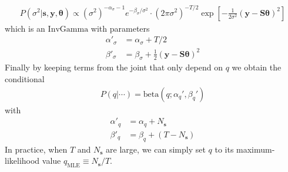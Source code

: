 \documentclass{article}
\theoremstyle{remark}
\begin{document}
\begin{align}
    P(\sigma^2| \bm{s},\bm{y},\bm\theta) \propto (\sigma^2)^{-\alpha_\sigma-1}e^{-\beta_\sigma/\sigma^2}\cdot (2\pi\sigma^2)^{-T/2}\exp\left[-\frac{1}{2\sigma^2}(\bm y-\bm{S\theta})^2\right] 
\end{align}
which is an $\mathrm{InvGamma}$ with parameters
\begin{align}
    \alpha'_{\sigma} &= \alpha_\sigma+T/2\\
    \beta'_\sigma &= \beta_\sigma+\frac{1}{2}(\bm y - \bm{S\theta})^2
\end{align}
Finally by keeping terms from the joint that only depend on $q$ we obtain the conditional
\begin{align}
    P(q|\cdots) = \mathrm{beta}(q;\alpha_q',\beta_q')
\end{align}
with 
\begin{align}
    \alpha'_q &= \alpha_q+N_{\bm{s}}\\
    \beta'_q &=\beta_q+(T-N_{\bm{s}})
\end{align}
In practice, when $T$ and $N_{\bm s}$ are large, we can simply set $q$ to its maximum-likelihood value $q_\mathrm{MLE}\equiv N_{\bm s}/T$.
\end{document}
